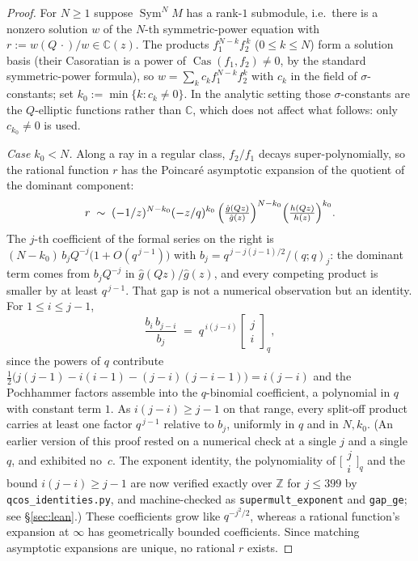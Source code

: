 \documentclass[11pt]{article}
\theoremstyle{plain}
\theoremstyle{definition}
\theoremstyle{remark}
\newcommand{\Z}{\mathbb{Z}}
\newcommand{\C}{\mathbb{C}}
\begin{document}
\begin{proof}
For $N\ge1$ suppose $\operatorname{Sym}^N\!M$ has a rank-$1$ submodule, i.e.\ there is a nonzero
solution $w$ of the $N$-th symmetric-power equation with $r:=w(Q\,\cdot)/w\in\C(z)$. The products
$f_1^{N-k}f_2^{\,k}$ ($0\le k\le N$) form a solution basis (their Casoratian is a power
of $\operatorname{Cas}(f_1,f_2)\ne0$, by the standard symmetric-power formula), so
$w=\sum_kc_kf_1^{N-k}f_2^k$ with $c_k$ in the field of $\sigma$-constants; set
$k_0:=\min\{k:c_k\ne0\}$. In the analytic setting those $\sigma$-constants are the
$Q$-elliptic functions rather than $\C$, which does not affect what follows: only
$c_{k_0}\ne0$ is used.

\emph{Case $k_0<N$.} Along a ray in a regular class, $f_2/f_1$ decays super-polynomially, so the
rational function $r$ has the Poincar\'e asymptotic expansion of the quotient of the dominant
component:
\[
   r\;\sim\;(-1/z)^{N-k_0}(-z/q)^{k_0}\,
   \Bigl(\tfrac{\hat g(Qz)}{\hat g(z)}\Bigr)^{N-k_0}
   \Bigl(\tfrac{h(Qz)}{h(z)}\Bigr)^{k_0}.
\]
The $j$-th coefficient of the formal series on the right is
$(N-k_0)\,b_jQ^{-j}\bigl(1+O(q^{\,j-1})\bigr)$ with $b_j=q^{\,j-j(j-1)/2}/(q;q)_j$: the dominant term
comes from $b_jQ^{-j}$ in $\hat g(Qz)/\hat g(z)$, and every competing product is smaller by at least
$q^{\,j-1}$. That gap is not a numerical observation but an identity. For $1\le i\le j-1$,
\begin{equation}\label{eq:supermult}
   \frac{b_i\,b_{j-i}}{b_j}\;=\;q^{\,i(j-i)}\begin{bmatrix}j\\i\end{bmatrix}_q ,
\end{equation}
since the powers of $q$ contribute
$\tfrac12\bigl(j(j-1)-i(i-1)-(j-i)(j-i-1)\bigr)=i(j-i)$ and the Pochhammer factors assemble into the
$q$-binomial coefficient, a polynomial in $q$ with constant term $1$. As $i(j-i)\ge j-1$ on that
range, every split-off product carries at least one factor $q^{\,j-1}$ relative to $b_j$, uniformly
in $q$ and in $N,k_0$. (An earlier version of this proof rested on a numerical check at a single $j$
and a single $q$, and exhibited no~$c$. The exponent identity, the polynomiality of
$\bigl[\begin{smallmatrix}j\\i\end{smallmatrix}\bigr]_q$ and the bound $i(j-i)\ge j-1$ are now
verified exactly over $\Z$ for $j\le399$ by \texttt{qcos\_identities.py}, and machine-checked as
\texttt{supermult\_exponent} and \texttt{gap\_ge}; see \S\ref{sec:lean}.) These coefficients grow like $q^{-j^2/2}$, whereas a rational
function's expansion at $\infty$ has geometrically bounded coefficients. Since matching asymptotic
expansions are unique, no rational $r$ exists.


\end{proof}
\end{document}
